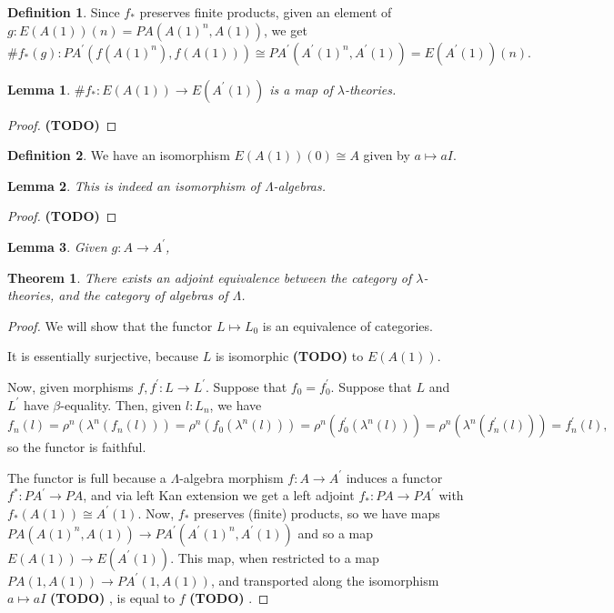 \documentclass[a4paper]{amsbook}
\newtheorem{lemma}{Lemma}
\newtheorem{theorem}{Theorem}
\theoremstyle{definition}
\newtheorem{definition}{Definition}
\theoremstyle{remark}
\newcommand\TODO{\textbf{(TODO)} }
\begin{document}
  \begin{definition}
    Since $ f_* $ preserves finite products, given an element of $ g: E(A(1))(n) = PA(A(1)^n, A(1)) $, we get
    \[ \# f_*(g): PA^\prime(f(A(1)^n), f(A(1))) \cong PA^\prime(A^\prime(1)^n, A^\prime(1)) = E(A^\prime(1))(n). \]
  \end{definition}

  \begin{lemma}
    $ \# f_*: E(A(1)) \to E(A^\prime(1)) $ is a map of $ \lambda $-theories.
  \end{lemma}
  \begin{proof}
    \TODO
  \end{proof}

  \begin{definition}
    We have an isomorphism $ E(A(1))(0) \cong A $ given by $ a \mapsto a I $.
  \end{definition}

  \begin{lemma}
    This is indeed an isomorphism of $ \Lambda $-algebras.
  \end{lemma}
  \begin{proof}
    \TODO
  \end{proof}

  \begin{lemma}
    Given $ g: A \to A^\prime $,
  \end{lemma}

  \begin{theorem}
    There exists an adjoint equivalence between the category of $ \lambda $-theories, and the category of algebras of $ \Lambda $.
  \end{theorem}
  \begin{proof}
    We will show that the functor $ L \mapsto L_0 $ is an equivalence of categories.

    It is essentially surjective, because $ L $ is isomorphic \TODO to $ E(A(1)) $.

    Now, given morphisms $ f, f^\prime: L \to L^\prime $. Suppose that $ f_0 = f^\prime_0 $. Suppose that $ L $ and $ L^\prime $ have $ \beta $-equality. Then, given $ l: L_n $, we have
    \[ f_n(l) = \rho^n(\lambda^n(f_n(l))) = \rho^n(f_0(\lambda^n(l))) = \rho^n(f^\prime_0(\lambda^n(l))) = \rho^n(\lambda^n(f^\prime_n(l))) = f^\prime_n(l), \]
    so the functor is faithful.

    The functor is full because a $ \Lambda $-algebra morphism $ f: A \to A^\prime $ induces a functor $ f^*: PA^\prime \to PA $, and via left Kan extension we get a left adjoint $ f_*: PA \to PA^\prime $ with $ f_*(A(1)) \cong A^\prime(1) $. Now, $ f_* $ preserves (finite) products, so we have maps $ PA(A(1)^n, A(1)) \to PA^\prime(A^\prime(1)^n, A^\prime(1)) $ and so a map $ E(A(1)) \to E(A^\prime(1)) $. This map, when restricted to a map $ PA(1, A(1)) \to PA^\prime(1, A(1)) $, and transported along the isomorphism $ a \mapsto a I $ \TODO, is equal to $ f $ \TODO.
  \end{proof}
\end{document}
